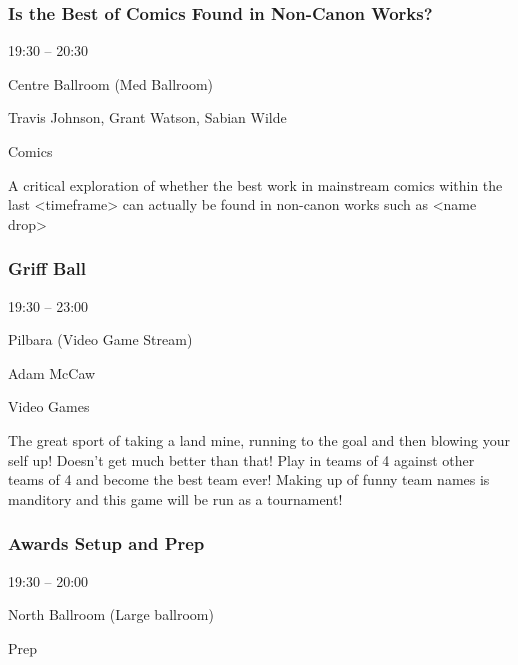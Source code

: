 \documentclass{scrreprt}
\begin{document}
\begin{multicols}{2}
\subsubsection*{Is the Best of Comics Found in Non-Canon Works?}\begin{description}
\setlength{\itemsep}{0pt}
\setlength{\parsep}{0pt}
\setlength{\parskip}{0pt}
\item[Time:]{19:30 -- 20:30}
\item[Venue:]{Centre Ballroom (Med Ballroom)}
\item[People:]{Travis Johnson, Grant Watson, Sabian Wilde}
\item[Tags:]{Comics}\end{description}
A critical exploration of whether the best work in mainstream comics within the last <timeframe> can actually be found in non-canon works such as <name drop>
\subsubsection*{Griff Ball}\begin{description}
\setlength{\itemsep}{0pt}
\setlength{\parsep}{0pt}
\setlength{\parskip}{0pt}
\item[Time:]{19:30 -- 23:00}
\item[Venue:]{Pilbara (Video Game Stream)}
\item[People:]{Adam McCaw}
\item[Tags:]{Video Games}\end{description}
The great sport of taking a land mine, running to the goal and then blowing your self up! Doesn't get much better than that! Play in teams of 4 against other teams of 4 and become the best team ever! Making up of funny team names is manditory and this game will be run as a tournament!
\subsubsection*{Awards Setup and Prep}\begin{description}
\setlength{\itemsep}{0pt}
\setlength{\parsep}{0pt}
\setlength{\parskip}{0pt}
\item[Time:]{19:30 -- 20:00}
\item[Venue:]{North Ballroom (Large ballroom)}
\item[Tags:]{Prep}\end{description}


\end{multicols}
\end{document}

